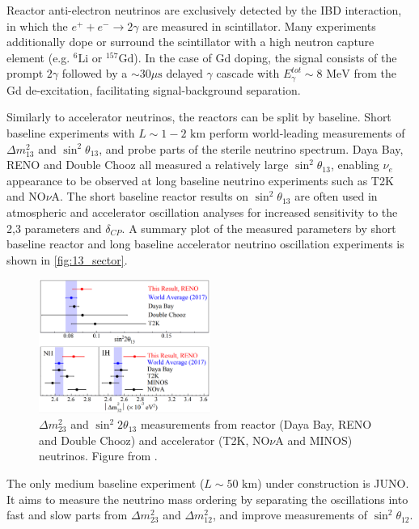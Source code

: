 Reactor anti-electron neutrinos are exclusively detected by the IBD interaction, in which the $e^+ + e^- \rightarrow 2\gamma$ are measured in scintillator. Many experiments additionally dope or surround the scintillator with a high neutron capture element (e.g. $^{6}\text{Li}$ or $^{157}\text{Gd}$). In the case of Gd doping, the signal consists of the prompt $2\gamma$ followed by a $\sim30\mu\text{s}$ delayed $\gamma$ cascade with $E_\gamma^{tot}\sim8\text{ MeV}$ from the Gd de-excitation, facilitating signal-background separation\cite{daya_bay,reno}.

Similarly to accelerator neutrinos, the reactors can be split by baseline. Short baseline experiments with $L\sim1-2\text{ km}$ perform world-leading measurements of $\Delta m^2_{13}$ and $\sin^2\theta_{13}$, and probe parts of the sterile neutrino spectrum. Daya Bay\cite{daya_bay_disc}, RENO\cite{reno_disc} and Double Chooz\cite{double_chooz} all measured a relatively large $\sin^2 \theta_{13}$, enabling $\nu_e$ appearance to be observed at long baseline neutrino experiments such as T2K and NO$\nu$A. The short baseline reactor results on $\sin^2\theta_{13}$ are often used in atmospheric and accelerator oscillation analyses for increased sensitivity to the 2,3 parameters and $\delta_{CP}$. A summary plot of the measured parameters by short baseline reactor and long baseline accelerator neutrino oscillation experiments is shown in \autoref{fig:13_sector}.
\begin{figure}[h]
	\includegraphics[width=0.5\textwidth, trim={0mm 0mm 0mm 0mm}, clip,page=1]{figures/theory/reno_theta_dm13}
	\caption{$\Delta m^2_{23}$ and $\sin^2 2\theta_{13}$ measurements from reactor (Daya Bay\cite{daya_bay}, RENO\cite{reno_new} and Double Chooz\cite{double_chooz_old}) and accelerator (T2K\cite{t2k_2015}, NO$\nu$A\cite{nova_2017} and MINOS\cite{minos_numu_nue}) neutrinos. Figure from \cite{reno_new}.}
	\label{fig:13_sector}
\end{figure}

The only medium baseline experiment ($L\sim50\text{ km}$) under construction is JUNO\cite{juno}. It aims to measure the neutrino mass ordering by separating the oscillations into fast and slow parts from $\Delta m^2_{23}$ and $\Delta m^2_{12}$, and improve measurements of $\sin^2 \theta_{12}$.


